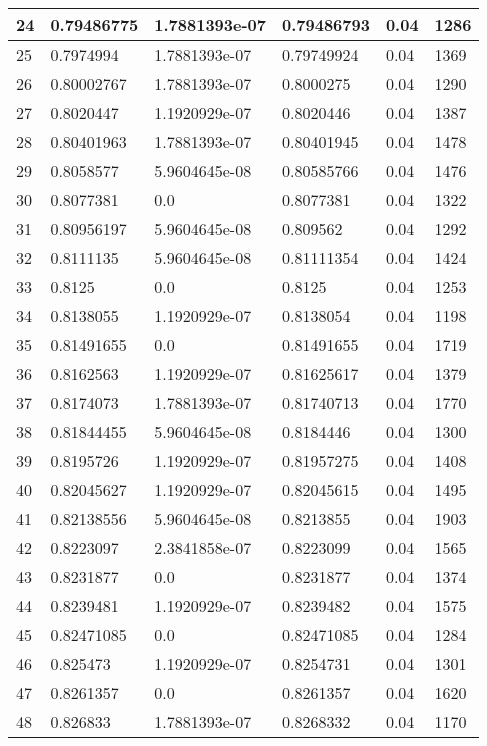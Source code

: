 \begin{longtable}{|l|l|l|l|l|l|}
24 & 0.79486775 & 1.7881393e-07 & 0.79486793 & 0.04 & 1286 \\ \hline 
25 & 0.7974994 & 1.7881393e-07 & 0.79749924 & 0.04 & 1369 \\ \hline 
26 & 0.80002767 & 1.7881393e-07 & 0.8000275 & 0.04 & 1290 \\ \hline 
27 & 0.8020447 & 1.1920929e-07 & 0.8020446 & 0.04 & 1387 \\ \hline 
28 & 0.80401963 & 1.7881393e-07 & 0.80401945 & 0.04 & 1478 \\ \hline 
29 & 0.8058577 & 5.9604645e-08 & 0.80585766 & 0.04 & 1476 \\ \hline 
30 & 0.8077381 & 0.0 & 0.8077381 & 0.04 & 1322 \\ \hline 
31 & 0.80956197 & 5.9604645e-08 & 0.809562 & 0.04 & 1292 \\ \hline 
32 & 0.8111135 & 5.9604645e-08 & 0.81111354 & 0.04 & 1424 \\ \hline 
33 & 0.8125 & 0.0 & 0.8125 & 0.04 & 1253 \\ \hline 
34 & 0.8138055 & 1.1920929e-07 & 0.8138054 & 0.04 & 1198 \\ \hline 
35 & 0.81491655 & 0.0 & 0.81491655 & 0.04 & 1719 \\ \hline 
36 & 0.8162563 & 1.1920929e-07 & 0.81625617 & 0.04 & 1379 \\ \hline 
37 & 0.8174073 & 1.7881393e-07 & 0.81740713 & 0.04 & 1770 \\ \hline 
38 & 0.81844455 & 5.9604645e-08 & 0.8184446 & 0.04 & 1300 \\ \hline 
39 & 0.8195726 & 1.1920929e-07 & 0.81957275 & 0.04 & 1408 \\ \hline 
40 & 0.82045627 & 1.1920929e-07 & 0.82045615 & 0.04 & 1495 \\ \hline 
41 & 0.82138556 & 5.9604645e-08 & 0.8213855 & 0.04 & 1903 \\ \hline 
42 & 0.8223097 & 2.3841858e-07 & 0.8223099 & 0.04 & 1565 \\ \hline 
43 & 0.8231877 & 0.0 & 0.8231877 & 0.04 & 1374 \\ \hline 
44 & 0.8239481 & 1.1920929e-07 & 0.8239482 & 0.04 & 1575 \\ \hline 
45 & 0.82471085 & 0.0 & 0.82471085 & 0.04 & 1284 \\ \hline 
46 & 0.825473 & 1.1920929e-07 & 0.8254731 & 0.04 & 1301 \\ \hline 
47 & 0.8261357 & 0.0 & 0.8261357 & 0.04 & 1620 \\ \hline 
48 & 0.826833 & 1.7881393e-07 & 0.8268332 & 0.04 & 1170 \\ \hline 

\end{longtable}
